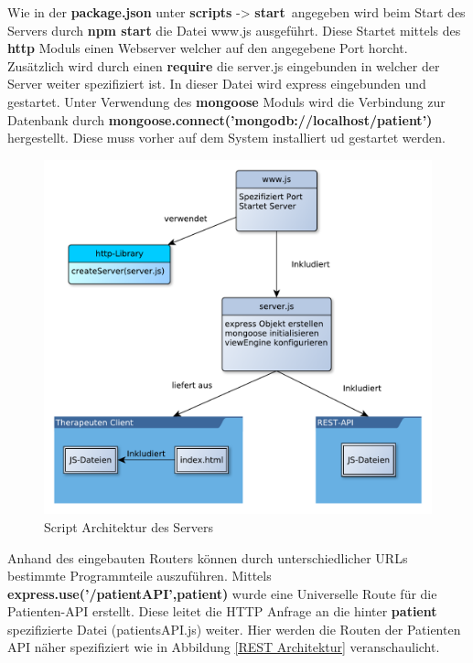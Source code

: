 Wie in der \textbf{package.json} unter \textbf{scripts} -> \textbf{start}\ angegeben wird beim Start des Servers durch \textbf{npm start} die Datei www.js ausgeführt. Diese Startet mittels des \textbf{http} Moduls einen Webserver welcher auf den angegebene Port horcht. Zusätzlich wird durch einen \textbf{require} die server.js eingebunden in welcher der Server weiter spezifiziert ist. In dieser Datei wird express eingebunden und gestartet. Unter Verwendung des \textbf{mongoose} Moduls wird die Verbindung zur Datenbank durch \textbf{mongoose.connect('mongodb://localhost/patient')} hergestellt. Diese muss vorher auf dem System installiert ud gestartet werden.
\begin{figure}[H]
	\centering
	\includegraphics[scale=0.6]{images/ServerScriptArchitektur}
	\caption[Script Architektur des Servers]{Script Architektur des Servers}
	\label{ServerScriptArchitektur}
\end{figure}
Anhand des eingebauten Routers können durch unterschiedlicher URLs bestimmte Programmteile auszuführen. Mittels \textbf{express.use('/patientAPI',patient)} wurde eine Universelle Route für die Patienten-API erstellt. Diese leitet die HTTP Anfrage an die hinter \textbf{patient} spezifizierte Datei (patientsAPI.js) weiter. Hier werden die Routen der Patienten API näher spezifiziert wie in Abbildung \ref{REST Architektur} veranschaulicht.

